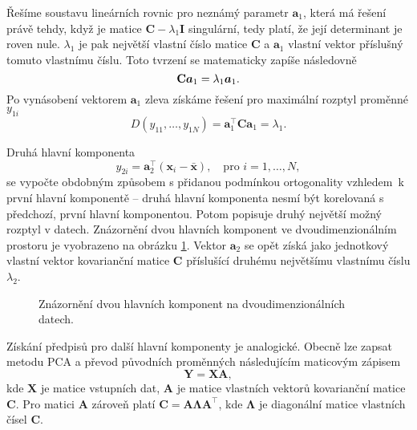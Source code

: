 Řešíme soustavu lineárních rovnic pro neznámý parametr $\bm{a}_1$, která má řešení právě tehdy, když je matice $\mathbf{C} - \lambda_1 \mathbf{I} $ singulární, tedy platí, že její determinant  je roven nule. $\lambda_1$ je pak největší vlastní číslo matice $\mathbf{C}$ a $\bm{a}_1$ vlastní vektor příslušný tomuto vlastnímu číslu. Toto tvrzení se matematicky zapíše následovně
\begin{equation}
    \mathbf{C} \bm{a}_1 = \lambda_1 \bm{a}_1. \\
\end{equation}
Po vynásobení vektorem $\bm{a}_1$ zleva získáme řešení pro maximální rozptyl proměnné $y_{1i}$
\begin{equation}
    D(y_{11}, \ldots, y_{1N}) = \bm{a}_1^\top \mathbf{C} \bm{a}_1 = \lambda_1.
\end{equation}


Druhá hlavní komponenta
\begin{equation}
    y_{2i} = \bm{a}_2^\top (\bm{x}_i - \bar{\bm{x}}), \quad \mbox{pro } i=1,\ldots,N,
\end{equation}
se vypočte obdobným způsobem s přidanou podmínkou ortogonality vzhledem~k první hlavní komponentě -- druhá hlavní komponenta nesmí být korelovaná s předchozí, první hlavní komponentou. Potom popisuje druhý největší možný rozptyl v datech. Znázornění dvou hlavních komponent ve dvoudimenzionálním prostoru je vyobrazeno na obrázku \ref*{obr:met:PCA1}.
Vektor  $\bm{a}_2$ se opět získá jako jednotkový vlastní vektor kovarianční matice $\mathbf{C}$ příslušící druhému největšímu vlastnímu číslu $\lambda_2$.\cite{bib:PCA1} %

\begin{figure}[hbtp!]
    \centering
    \caption{Znázornění dvou hlavních komponent na dvoudimenzionálních datech.}
    \label{obr:met:PCA1}
\end{figure}


Získání předpisů pro další hlavní komponenty je analogické. Obecně lze zapsat metodu PCA a převod původních proměnných následujícím maticovým zápisem
\begin{equation}
    \mathbf{Y} = \mathbf{XA}, 
\end{equation}
kde $\mathbf{X}$ je matice vstupních dat, $\mathbf{A}$ je matice vlastních vektorů kovarianční matice $\mathbf{C}$. Pro matici $\mathbf{A}$ zároveň platí $\mathbf{C} =  \mathbf{A} \mathbf{\Lambda} \mathbf{A}^\top$, kde $\mathbf{\Lambda}$ je diagonální matice vlastních čísel $\mathbf{C}$.\cite{bib:PCA2}  %

